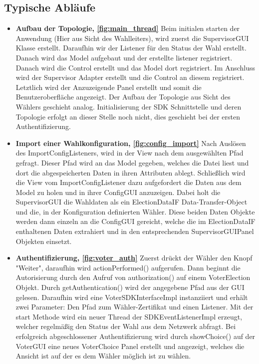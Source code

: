 \documentclass[parskip=full]{scrartcl}
\newcommand{\fakeparagraph}[1]{\textbf{#1}}
\begin{document}
\subsection{Typische Abläufe}
	\begin{itemize}
	\item\fakeparagraph{Aufbau der Topologie, \autoref{fig:main_thread} } Beim initialen starten der Anwendung (Hier aus Sicht des Wahlleiters), wird zuerst die SupervisorGUI Klasse erstellt. Daraufhin wir der Listener für den Status der Wahl erstellt. Danach wird das Model aufgebaut und der erstellte listener registriert. Danach wird die Control erstellt und das Model dort registriert. Im Anschluss wird der Supervisor Adapter erstellt und die Control an diesem registriert. Letztlich wird der Anzuzeigende Panel erstellt und somit die Benutzeroberfläche angezeigt.
	Der Aufbau der Topologie aus Sicht des Wählers geschieht analog.
	Initialisierung der SDK Schnittstelle und deren Topologie erfolgt an dieser Stelle noch nicht, dies geschieht bei der ersten Authentifizierung.
	
	\item\fakeparagraph{Import einer Wahlkonfiguration, \autoref{fig:config_import}} Nach Auslösen des ImportConfigListeners, wird in der View nach dem ausgewählten Pfad gefragt. Dieser Pfad wird an das Model gegeben, welches die Datei liest und dort die abgespeicherten Daten in ihren Attributen ablegt.
	Schließlich wird die View vom ImportConfigListener dazu aufgefordert die Daten aus dem Model zu holen und in ihrer ConfigGUI anzuzeigen.
	Dabei holt die SupervisorGUI die Wahldaten als ein ElectionDataIF Data-Transfer-Object und die, in der Konfiguration definierten Wähler. Diese beiden Daten Objekte werden dann einzeln an die ConfigGUI gereicht, welche die im ElectionDataIF enthaltenen Daten extrahiert und in den entsprechenden SupervisorGUIPanel Objekten einsetzt.
	
	\item\fakeparagraph{Authentifizierung, \autoref{fig:voter_auth} } Zuerst drückt der Wähler den Knopf "Weiter", daraufhin wird actionPerformed() aufgerufen.
	Dann beginnt die Autorisierung durch den Aufruf von authorization() auf einem VoterElection Objekt.
	Durch getAuthentication() wird der angegebene Pfad aus der GUI gelesen.
	Daraufhin wird eine VoterSDKInterfaceImpl instanziiert und erhält zwei Parameter: Den Pfad zum Wähler-Zertifikat und einen Listener.
	Mit der start Methode wird ein neuer Thread der SDKEventListenerImpl erzeugt, welcher regelmäßig den Status der Wahl aus dem Netzwerk abfragt.
	Bei erfolgreich abgeschlossener Authentifizierung wird durch showChoice() auf der VoterGUI eine neues VoterChoice Panel erstellt und angezeigt, welches die Ansicht ist auf der es dem Wähler möglich ist zu wählen.
	

\end{itemize}
\end{document}
